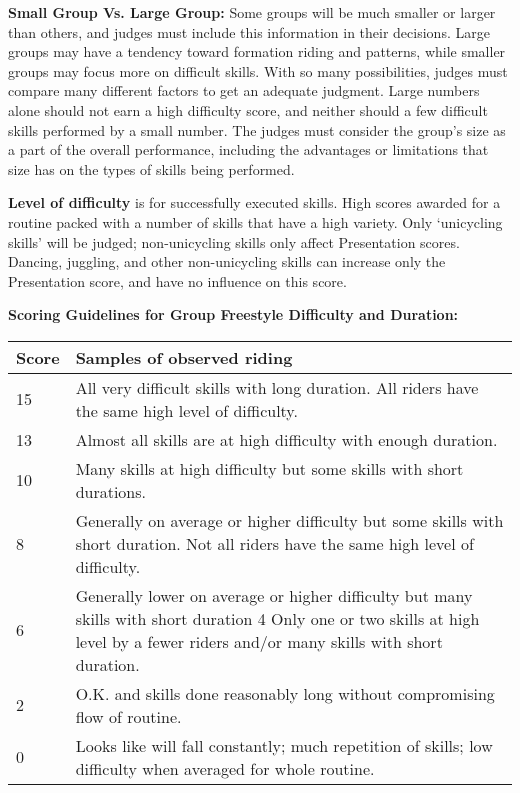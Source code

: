 \textbf{Small Group Vs. Large Group:} Some groups will be much smaller or larger than others, and judges must include this information in their decisions.
Large groups may have a tendency toward formation riding and patterns, while smaller groups may focus more on difficult skills.
With so many possibilities, judges must compare many different factors to get an adequate judgment.
Large numbers alone should not earn a high difficulty score, and neither should a few difficult skills performed by a small number.
The judges must consider the group's size as a part of the overall performance, including the advantages or limitations that size has on the types of skills being performed.

\textbf{Level of difficulty} is for successfully executed skills.
High scores awarded for a routine packed with a number of skills that have a high variety.
Only ‘unicycling skills' will be judged; non-unicycling skills only affect Presentation scores.
Dancing, juggling, and other non-unicycling skills can increase only the Presentation score, and have no influence on this score.

\textbf{Scoring Guidelines for Group Freestyle Difficulty and Duration:}

\begin{tabular}{|l|p{12.5cm}|}
\hline
\textbf{Score} & \textbf{Samples of observed riding} \\
\hline
15 & All very difficult skills with long duration.
All riders have the same high level of difficulty. \\
\hline
13 & Almost all skills are at high difficulty with enough duration. \\
\hline
10 & Many skills at high difficulty but some skills with short durations. \\
\hline
8 & Generally on average or higher difficulty but some skills with short duration.
Not all riders have the same high level of difficulty. \\
\hline
6 & Generally lower on average or higher difficulty but many skills with short duration 4 Only one or two skills at high level by a fewer riders and/or many skills with short duration. \\
\hline
2 & O.K. and skills done reasonably long without compromising flow of routine. \\
\hline
0 & Looks like will fall constantly; much repetition of skills; low difficulty when averaged for whole routine. \\
\hline
\end{tabular}

